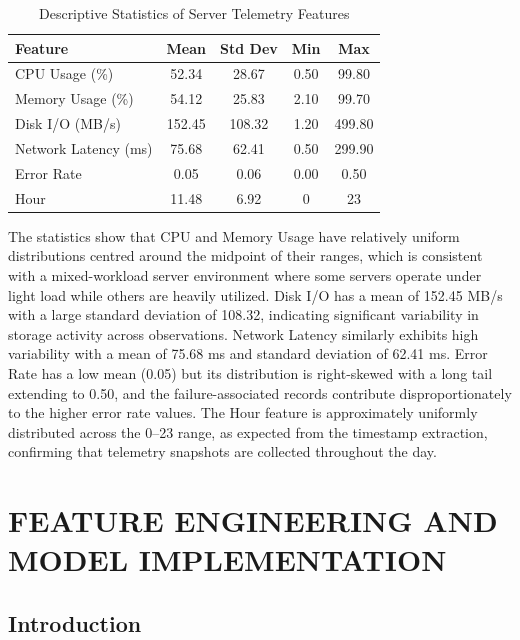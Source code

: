 \documentclass[12pt,letterpaper]{report}
\begin{document}
\begin{table}[H]
\centering
\caption{Descriptive Statistics of Server Telemetry Features}
\label{tab:dataset_stats}
\begin{tabular}{lcccc}
\toprule
\textbf{Feature} & \textbf{Mean} & \textbf{Std Dev} & \textbf{Min} & \textbf{Max} \\
\midrule
CPU Usage (\%) & 52.34 & 28.67 & 0.50 & 99.80 \\
Memory Usage (\%) & 54.12 & 25.83 & 2.10 & 99.70 \\
Disk I/O (MB/s) & 152.45 & 108.32 & 1.20 & 499.80 \\
Network Latency (ms) & 75.68 & 62.41 & 0.50 & 299.90 \\
Error Rate & 0.05 & 0.06 & 0.00 & 0.50 \\
Hour & 11.48 & 6.92 & 0 & 23 \\
\bottomrule
\end{tabular}
\end{table}

The statistics show that CPU and Memory Usage have relatively uniform distributions centred around the midpoint of their ranges, which is consistent with a mixed-workload server environment where some servers operate under light load while others are heavily utilized. Disk I/O has a mean of 152.45 MB/s with a large standard deviation of 108.32, indicating significant variability in storage activity across observations. Network Latency similarly exhibits high variability with a mean of 75.68 ms and standard deviation of 62.41 ms. Error Rate has a low mean (0.05) but its distribution is right-skewed with a long tail extending to 0.50, and the failure-associated records contribute disproportionately to the higher error rate values. The Hour feature is approximately uniformly distributed across the 0--23 range, as expected from the timestamp extraction, confirming that telemetry snapshots are collected throughout the day.


\chapter{FEATURE ENGINEERING AND MODEL IMPLEMENTATION}

\section{Introduction}
\end{document}
